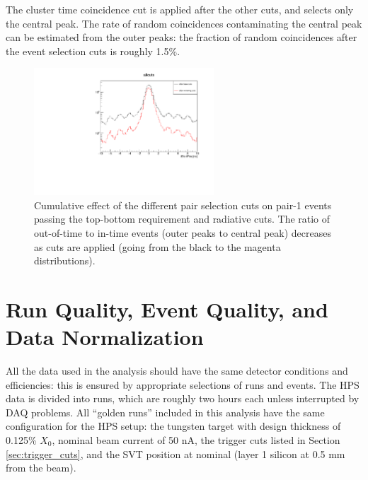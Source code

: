 The cluster time coincidence cut is applied after the other cuts, and selects only the central peak.
The rate of random coincidences contaminating the central peak can be estimated from the outer peaks: the fraction of random coincidences after the event selection cuts is roughly 1.5\%.

\begin{figure}[ht]
\begin{center}
    \includegraphics[width=0.6\textwidth,page=2,angle=-90]{recon/figs/basecutplots}
\end{center}
    \caption{Cumulative effect of the different pair selection cuts on pair-1 events passing the top-bottom requirement and radiative cuts.
    The ratio of out-of-time to in-time events (outer peaks to central peak) decreases as cuts are applied (going from the black to the magenta distributions).
    }
    \label{fig:basecut_performance}
\end{figure}

\section{Run Quality, Event Quality, and Data Normalization}
\label{sec:luminosity}
All the data used in the analysis should have the same detector conditions and efficiencies: this is ensured by appropriate selections of runs and events.
The HPS data is divided into runs, which are roughly two hours each unless interrupted by DAQ problems.
All ``golden runs'' included in this analysis have the same configuration for the HPS setup: the tungsten target with design thickness of 0.125\% $X_0$, nominal beam current of 50 nA, the trigger cuts listed in Section \ref{sec:trigger_cuts}, and the SVT position at nominal (layer 1 silicon at 0.5 mm from the beam).

